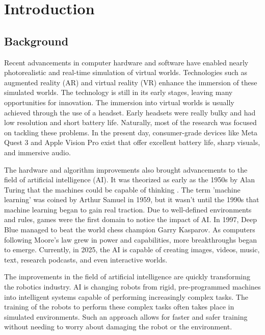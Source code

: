 \chapter{Introduction}
\label{chap:introduction}

\section{Background}
Recent advancements in computer hardware and software have enabled nearly photorealistic and real-time simulation of virtual worlds. Technologies such as augmented reality (AR) and virtual reality (VR) enhance the immersion of these simulated worlds. The technology is still in its early stages, leaving many opportunities for innovation. The immersion into virtual worlds is usually achieved through the use of a headset. Early headsets were really bulky and had low resolution and short battery life. Naturally, most of the research was focused on tackling these problems. In the present day, consumer-grade devices like Meta Quest 3 and Apple Vision Pro exist that offer excellent battery life, sharp visuals, and immersive audio.

\bigskip \noindent
The hardware and algorithm improvements also brought advancements to the field of artificial intelligence (AI). It was theorized as early as the 1950s by Alan Turing that the machines could be capable of thinking \cite{10.1093/mind/LIX.236.433}. The term 'machine learning' was coined by Arthur Samuel in 1959, but it wasn't until the 1990s that machine learning began to gain real traction. Due to well-defined environments and rules, games were the first domain to notice the impact of AI. In 1997, Deep Blue \cite{deepblue} managed to beat the world chess champion Garry Kasparov. As computers following Moore's law \cite{moore1998cramming} grew in power and capabilities, more breakthroughs began to emerge. Currently, in 2025, the AI is capable of creating images, videos, music, text, research podcasts, and even interactive worlds. 

\bigskip \noindent
The improvements in the field of artificial intelligence are quickly transforming the robotics industry. AI is changing robots from rigid, pre-programmed machines into intelligent systems capable of performing increasingly complex tasks. The training of the robots to perform these complex tasks often takes place in simulated environments. Such an approach allows for faster and safer training without needing to worry about damaging the robot or the environment.

